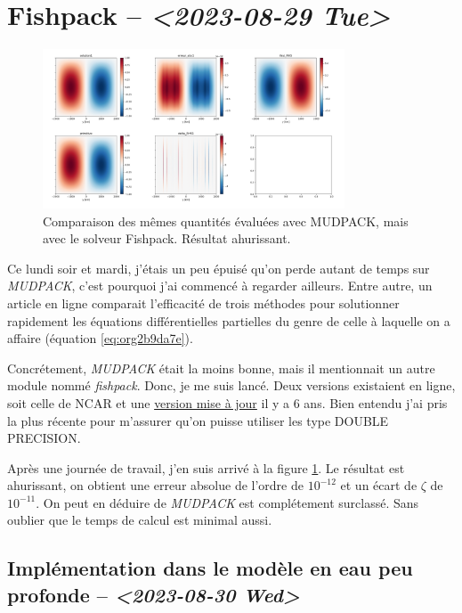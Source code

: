 \documentclass[10pt]{article}
\numberwithin{equation}{section}
\begin{document}
\section{Fishpack -- \textit{<2023-08-29 Tue>}}
\label{sec:orgdcf76fe}

\begin{figure}[!htpb]
\centering
\includegraphics[width=0.8\textwidth]{figures/fishpack/2023-08-29-fishtest.png}
\caption{\label{fig:orgd9b9cfb}Comparaison des mêmes quantités évaluées avec MUDPACK, mais avec le solveur Fishpack. Résultat ahurissant.}
\end{figure}

Ce lundi soir et mardi, j'étais un peu épuisé qu'on perde autant de temps sur \emph{MUDPACK}, c'est pourquoi j'ai commencé à regarder ailleurs.
Entre autre, un article en ligne comparait l'efficacité de trois méthodes pour solutionner rapidement les équations différentielles partielles du genre de celle à laquelle on a affaire (équation \ref{eq:org2b9da7e}).\bigskip

Concrétement, \emph{MUDPACK} était la moins bonne, mais il mentionnait un autre module nommé \emph{fishpack}.
Donc, je me suis lancé.
Deux versions existaient en ligne, soit celle de NCAR et une \href{https://github.com/jlokimlin/fishpack}{version mise à jour} il y a 6 ans.
Bien entendu j'ai pris la plus récente pour m'assurer qu'on puisse utiliser les type DOUBLE PRECISION.\bigskip

Après une journée de travail, j'en suis arrivé à la figure \ref{fig:orgd9b9cfb}.
Le résultat est ahurissant, on obtient une erreur absolue de l'ordre de \(10^{-12}\) et un écart de \(\zeta\) de \(10^{-11}\).
On peut en déduire de \emph{MUDPACK} est complétement surclassé.
Sans oublier que le temps de calcul est minimal aussi.

\subsection{Implémentation dans le modèle en eau peu profonde -- \textit{<2023-08-30 Wed>}}
\label{sec:org94c8132}
\end{document}
